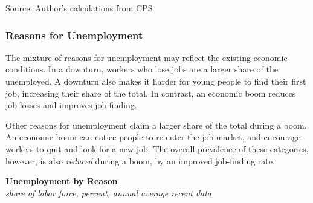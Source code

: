 \documentclass{report}
\newcommand{\tbllink}[1]{\href{https://raw.githubusercontent.com/bdecon/US-chartbook/master/chartbook/data/#1}{\faTable}}
\begin{document}
{\begin{minipage}{0.76\textwidth}
\footnotesize{Source: Author's calculations from CPS} \hfill \tbllink{unemp_grp.csv}
\end{minipage}
\newpage
\begin{minipage}{0.76\textwidth} 
\subsubsection*{Reasons for Unemployment}
\vspace{-0.5mm}
\small 

The mixture of reasons for unemployment may reflect the existing economic conditions. In a downturn, workers who lose jobs are a larger share of the unemployed. A downturn also makes it harder for young people to find their first job, increasing their share of the total. In contrast, an economic boom reduces job losses and improves job-finding. 

Other reasons for unemployment claim a larger share of the total during a boom. An economic boom can entice people to re-enter the job market, and encourage workers to quit and look for a new job. The overall prevalence of these categories, however, is also \textit{reduced} during a boom, by an improved job-finding rate. 
\vspace{1mm}

\normalsize \textbf{Unemployment by Reason}\\
\footnotesize{\textit{share of labor force, percent, annual average \hspace{36mm} recent data}}
\vspace{3.6cm}


\end{minipage}}
\end{document}
